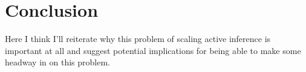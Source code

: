 \documentclass[onecolumn]{IEEEtran}
\begin{document}
\section{Conclusion}

Here I think I'll reiterate why this problem of scaling active inference is important at all and suggest potential implications for being able to make some headway in on this problem. 


% 
\printbibliography
\end{document}
